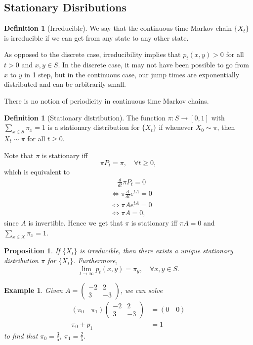 \documentclass{tufte-handout}
\newtheorem{ex}[thm]{Example}
\newtheorem{prop}[thm]{Proposition}
\theoremstyle{definition}
\newtheorem{defn}[thm]{Definition}
\begin{document}
\subsection{Stationary Disributions}

\begin{defn}[Irreducible]
	We say that the continuous-time Markov chain $\{X_t\}$ is irreducible if we can get from any state to any other state.
\end{defn}
As opposed to the discrete case, irreducibility implies that $p_t(x,y) > 0$ for all $t>0$ and $x,y \in S$. In the discrete case, it may not have been possible to go from $x$ to $y$ in 1 step, but in the continuous case, our jump times are exponentially distributed and can be arbitrarily small.

There is no notion of periodicity in continuous time Markov chains.

\begin{defn}[Stationary distribution]
	The function $\pi: S \to [0,1]$ with $\sum\limits_{x \in S}^{} \pi_x = 1$ is a stationary distribution for $\{X_t\}$ if whenever $X_0 \sim \pi$, then $X_t \sim \pi$ for all $t \ge 0$.

	Note that $\pi$ is stationary iff \[
		\pi P_t = \pi, \quad \forall t \ge 0
	,\] which is equivalent to
	\begin{align*}
		& \quad \frac{d}{dt} \pi P_{t} = 0 \\
		& \iff \pi \frac{d}{dt}e^{tA} = 0 \\
							   &\iff \pi A e^{tA} = 0 \\
							   &\iff \pi A = 0
	,\end{align*}
	since $A$ is invertible. Hence we get that $\pi$ is stationary iff $\pi A = 0$ and $\sum\limits_{x \in X}^{} \pi_x = 1$.
\end{defn}

\begin{prop}
	If $\{X_t\}$ is irreducible, then there exists a unique stationary distribution $\pi$ for $\{X_t\}$. Furthermore, \[
		\lim\limits_{t \to \infty} p_t(x,y) = \pi_y, \quad \forall x,y \in S
	.\] 
\end{prop}

\begin{ex}
	Given $A = \begin{pmatrix}
	-2 & 2 \\
	3 & -3
	\end{pmatrix}$, we can solve
	\begin{align*}
		(\pi_0 \quad \pi_1) \begin{pmatrix}
		-2 & 2 \\
		3 & -3
	\end{pmatrix} &= (0 \quad 0) \\
	\pi_0 + p_1 &=  1
	\end{align*}
	to find that $\pi_0 = \frac{3}{5}$, $\pi_1 = \frac{2}{5}.$
\end{ex}
\end{document}
